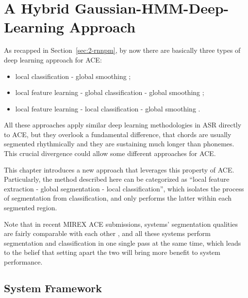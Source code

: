 
\chapter{A Hybrid Gaussian-HMM-Deep-Learning Approach}\label{cp:ghmm} %


As recapped in Section~\ref{sec:2-rnnpm}, by now there are basically three types of deep learning approach for ACE:
\begin{itemize}
\item local classification - global smoothing \cite{humphrey2012rethinking};
\item local feature learning - global classification - global smoothing \cite{boulanger2013audio,sigtia2015audio};
\item local feature learning - local classification - global smoothing \cite{zhou2015chord}.
\end{itemize}
All these approaches apply similar deep learning methodologies in ASR \cite{deng2014deep,bourlard2012connectionist} directly to ACE, but they overlook a fundamental difference, that chords are usually segmented rhythmically and they are sustaining much longer than phonemes. This crucial divergence could allow some different approaches for ACE.

This chapter introduces a new approach that leverages this property of ACE. Particularly, the method described here can be categorized as ``local feature extraction - global segmentation - local classification'', which isolates the process of segmentation from classification, and only performs the latter within each segmented region. 

Note that in recent MIREX ACE submissions, systems' segmentation qualities are fairly comparable with each other \cite{burgoyne2014comparative}, and all these systems perform segmentation and classification in one single pass at the same time, which leads to the belief that setting apart the two will bring more benefit to system performance.


\section{System Framework} \label{sec:3-sysframe}

